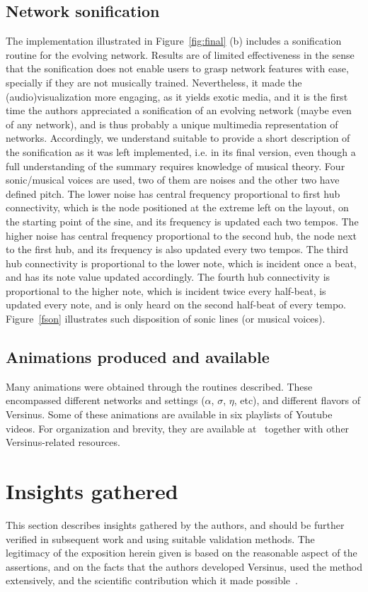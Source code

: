 \documentclass[runningheads]{llncs}
\begin{document}
\subsection{Network sonification}
The implementation illustrated in Figure~\ref{fig:final} (b) includes a sonification routine for the evolving network.
Results are of limited effectiveness in the sense that the sonification does not enable users to grasp network features with ease,
specially if they are not musically trained.
Nevertheless, it made the (audio)visualization more engaging, as it yields exotic media,
and it is the first time the authors appreciated a sonification of an evolving network (maybe even of any network),
and is thus probably a unique multimedia representation of networks.
Accordingly, we understand suitable to provide a short description of the sonification as it was left implemented,
i.e. in its final version,
even though a full understanding of the summary requires knowledge of musical theory.
Four sonic/musical voices are used, two of them are noises and the other two have defined pitch. The lower noise has central frequency proportional to first hub connectivity,
which is the node positioned at the extreme left on the layout, on the starting point of the sine, and its frequency is updated each two tempos.
The higher noise has central frequency proportional to the second hub, the node next to the first hub, and its frequency is also updated every two tempos.
The third hub connectivity is proportional to the lower note,
which is incident once a beat, and has its note value updated accordingly.
The fourth hub connectivity is proportional to the higher note, which is incident twice every half-beat, is updated every note, and is only heard on the second half-beat of every tempo.
Figure~\ref{fson} illustrates such disposition of sonic lines (or musical voices).

\subsection{Animations produced and available}\label{sec:vid}
Many animations were obtained through the routines described.
These encompassed different networks and settings ($\alpha$, $\sigma$, $\eta$,
etc), and different flavors of Versinus.
Some of these animations are available in six playlists of Youtube videos.
For organization and brevity, they are available at~\cite{verRepo} together with other Versinus-related resources.

\section{Insights gathered}\label{sec:ins}
This section describes insights gathered by the authors,
and should be further verified in subsequent work and using
suitable validation methods.
The legitimacy of the exposition herein given is based on the reasonable aspect of the assertions, and on the facts that the authors developed Versinus, used the method extensively, and the scientific contribution which it made possible~\cite{stab}.
\end{document}

